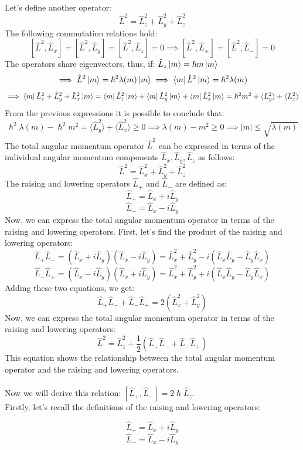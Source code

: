 \documentclass{article}
\begin{document}
Let's define another operator:
$$\hat{L}^2 = \hat{L}_z^2+ \hat{L}_y^2+ \hat{L}_z^2$$
The following commutation relations hold:
$$[\hat{L}^2, \hat{L}_x] = [\hat{L}^2, \hat{L}_y] = [\hat{L}^2, \hat{L}_z] = 0 \implies [\hat{L}^2, \hat{L}_+] = [\hat{L}^2, \hat{L}_-] = 0 $$
The operators share eigenvectors, thus, if: $\hat{L}_z \ket{m} = \hslash m \ket{m}$
$$\implies \hat{L}^2 \ket{m} = \hslash^2 \lambda(m) \ket{m} \implies \bra{m} \hat{L}^2 \ket{m} = \hslash^2 \lambda(m)$$
$$\implies \bra{m} \hat{L}_z^2 + \hat{L}_y^2 + \hat{L}_x^2 \ket{m} = \bra{m} \hat{L}_z^2 \ket{m} + \bra{m} \hat{L}^2_y\ket{m}+ \bra{m}\hat{L}_x^2 \ket{m} = \hslash^2 m^2 + \langle L_y^2 \rangle + \langle L_x^2 \rangle$$
From the previous expressions it is possible to conclude that:
$$\hslash^2 \lambda(m) - \hslash^2m^2 = \langle \hat{L}_y^2 \rangle + \langle \hat{L}_x^2 \rangle \geq 0 \implies \lambda(m) - m^2 \geq 0 \implies |m| \leq \sqrt{\lambda(m)}$$
The total angular momentum operator $\hat{L}^2$ can be expressed in terms of the individual angular momentum components $\hat{L}_x ,\hat{L}_y,\hat{L}_z$ as follows:
$$\hat{L}^2 = \hat{L}_x^2 + \hat{L}_y^2 + \hat{L}_z^2$$
The raising and lowering operators $\hat{L}_+$ and $\hat{L}_-$ are defined as:
$$\hat{L}_+ = \hat{L}_x + i \hat{L}_y$$
$$\hat{L}_- = \hat{L}_x - i \hat{L}_y$$
Now, we can express the total angular momentum operator in terms of the raising and lowering operators. First, let's find the product of the raising and lowering operators:
$$\hat{L}_+ \hat{L}_- = (\hat{L}_x + i \hat{L}_y)(\hat{L}_x - i \hat{L}_y) = \hat{L}_x^2 + \hat{L}_y^2 - i(\hat{L}_x \hat{L}_y - \hat{L}_y \hat{L}_x)$$
$$\hat{L}_- \hat{L}_+ = (\hat{L}_x - i \hat{L}_y)(\hat{L}_x + i \hat{L}_y) = \hat{L}_x^2 + \hat{L}_y^2 + i(\hat{L}_x \hat{L}_y - \hat{L}_y \hat{L}_x)$$
Adding these two equations, we get:
$$\hat{L}_+ \hat{L}_- + \hat{L}_- \hat{L}_+ = 2(\hat{L}_x^2 + \hat{L}_y^2)$$
Now, we can express the total angular momentum operator in terms of the raising and lowering operators:
$$\hat{L}^2 = \hat{L}_z^2 + \frac{1}{2}(\hat{L}_+ \hat{L}_- + \hat{L}_- \hat{L}_+)$$
This equation shows the relationship between the total angular momentum operator and the raising and lowering operators.\\ \\
Now we will derive this relation: $[\hat{L}_+,\hat{L}_-] = 2 \hslash \hat{L}_z$.\\ 
Firstly, let's recall the definitions of the raising and lowering operators:

$$\hat{L}_+ = \hat{L}_x + i \hat{L}_y$$
$$\hat{L}_- = \hat{L}_x - i \hat{L}_y$$
\end{document}
